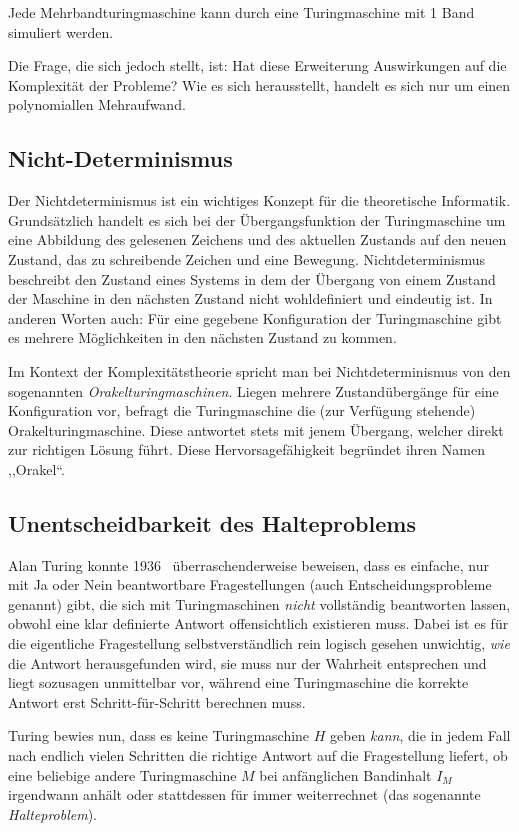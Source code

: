 Jede Mehrbandturingmaschine kann durch eine Turingmaschine mit 1 Band simuliert werden.

Die Frage, die sich jedoch stellt, ist: Hat diese Erweiterung Auswirkungen auf die Komplexität der Probleme? Wie es sich herausstellt, handelt es sich nur um einen polynomiallen Mehraufwand.
%
\subsection{Nicht-Determinismus}
\label{sec:nondeterminism}
%
Der Nichtdeterminismus ist ein wichtiges Konzept für die theoretische Informatik. Grundsätzlich handelt es sich bei der Übergangsfunktion der Turingmaschine um eine Abbildung des gelesenen Zeichens und des aktuellen Zustands auf den neuen Zustand, das zu schreibende Zeichen und eine Bewegung. Nichtdeterminismus beschreibt den Zustand eines Systems in dem der Übergang von einem Zustand der Maschine in den nächsten Zustand nicht wohldefiniert und eindeutig ist. In anderen Worten auch: Für eine gegebene Konfiguration der Turingmaschine gibt es mehrere Möglichkeiten in den nächsten Zustand zu kommen.

Im Kontext der Komplexitätstheorie spricht man bei Nichtdeterminismus von den sogenannten \emph{Orakelturingmaschinen}. Liegen mehrere Zustandübergänge für eine Konfiguration vor, befragt die Turingmaschine die (zur Verfügung stehende) Orakelturingmaschine. Diese antwortet stets mit jenem Übergang, welcher direkt zur richtigen Lösung führt. Diese Hervorsagefähigkeit begründet ihren Namen ,,Orakel``.
%
\subsection{Unentscheidbarkeit des Halteproblems}
\label{sec:haltingproblem}
%
Alan Turing konnte 1936~\cite{Turing01011937} überraschenderweise beweisen, dass es einfache, nur mit Ja oder Nein beantwortbare Fragestellungen (auch Entscheidungsprobleme genannt) gibt, die sich mit Turingmaschinen \emph{nicht} vollständig beantworten lassen, obwohl eine klar definierte Antwort offensichtlich existieren muss. Dabei ist es für die eigentliche Fragestellung selbstverständlich rein logisch gesehen unwichtig, \emph{wie} die Antwort herausgefunden wird, sie muss nur der Wahrheit entsprechen und liegt sozusagen unmittelbar vor, während eine Turingmaschine die korrekte Antwort erst Schritt-für-Schritt berechnen muss.

Turing bewies nun, dass es keine Turingmaschine $H$ geben \emph{kann}, die in jedem Fall nach endlich vielen Schritten die richtige Antwort auf die Fragestellung liefert, ob eine beliebige andere Turingmaschine $M$ bei anfänglichen Bandinhalt $I_M$ irgendwann anhält oder stattdessen für immer weiterrechnet (das sogenannte \emph{Halteproblem}).

